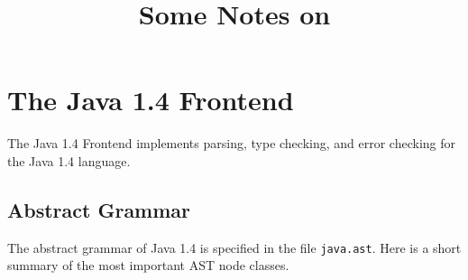 \documentclass{article}
\title{Some Notes on \JastAddJ}
\author{}
\newcommand{\file}[1]{\texttt{#1}}
\begin{document}
\maketitle
\section{The Java 1.4 Frontend}
The Java 1.4 Frontend implements parsing, type checking, and error checking for the Java 1.4 language.

\subsection{Abstract Grammar}
The abstract grammar of Java 1.4 is specified in the file \file{java.ast}. Here is a short summary of the most important AST node classes.
\end{document}
